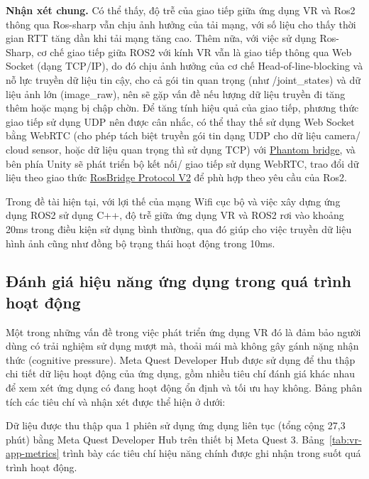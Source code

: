 \textbf{Nhận xét chung.}
Có thể thấy, độ trễ của giao tiếp giữa ứng dụng VR và Ros2 thông qua Ros-sharp vẫn chịu ảnh hưởng của tải mạng, với số liệu cho thấy thời gian RTT tăng dần khi tải mạng tăng cao. Thêm nữa, với việc sử dụng Ros-Sharp, cơ chế giao tiếp giữa ROS2 với kính VR vẫn là giao tiếp thông qua Web Socket (dạng TCP/IP), do đó chịu ảnh hưởng của cơ chế Head-of-line-blocking và nỗ lực truyền dữ liệu tin cậy, cho cả gói tin quan trọng (như /joint\_states) và dữ liệu ảnh lớn (image\_raw), nên sẽ gặp vấn đề nếu lượng dữ liệu truyền đi tăng thêm hoặc mạng bị chập chờn. Để tăng tính hiệu quả của giao tiếp, phương thức giao tiếp sử dụng UDP nên được cân nhắc, có thể thay thế sử dụng Web Socket bằng WebRTC (cho phép tách biệt truyền gói tin dạng UDP cho dữ liệu camera/ cloud sensor, hoặc dữ liệu quan trọng thì sử dụng TCP) với \href{https://docs.phntm.io/bridge/}{Phantom bridge}, và bên phía Unity sẽ phát triển bộ kết nối/ giao tiếp sử dụng WebRTC, trao đổi dữ liệu theo giao thức \href{https://github.com/RobotWebTools/rosbridge_suite/blob/ros2/ROSBRIDGE_PROTOCOL.md#422-default-qos-settings}{RosBridge Protocol V2} để phù hợp theo yêu cầu của Ros2.

Trong đề tài hiện tại, với lợi thế của mạng Wifi cục bộ và việc xây dựng ứng dụng ROS2 sử dụng C++, độ trễ giữa ứng dụng VR và ROS2 rơi vào khoảng 20ms trong điều kiện sử dụng bình thường, qua đó giúp cho việc truyền dữ liệu hình ảnh cũng như đồng bộ trạng thái hoạt động trong 10ms. 

\subsection{Đánh giá hiệu năng ứng dụng trong quá trình hoạt động}

Một trong những vấn đề trong việc phát triển ứng dụng VR đó là đảm bảo người dùng có trải nghiệm sử dụng mượt mà, thoải mái mà không gây gánh nặng nhận thức (cognitive pressure). Meta Quest Developer Hub được sử dụng để thu thập chi tiết dữ liệu hoạt động của ứng dụng, gồm nhiều tiêu chí đánh giá khác nhau để xem xét ứng dụng có đang hoạt động ổn định và tối ưu hay không. Bảng phân tích các tiêu chí và nhận xét được thể hiện ở dưới:

Dữ liệu được thu thập qua 1 phiên sử dụng ứng dụng liên tục (tổng cộng
27{,}3\,phút) bằng Meta Quest Developer Hub trên thiết bị Meta Quest 3.
Bảng~\ref{tab:vr-app-metrics} trình bày các tiêu chí hiệu năng chính được ghi nhận
trong suốt quá trình hoạt động.

